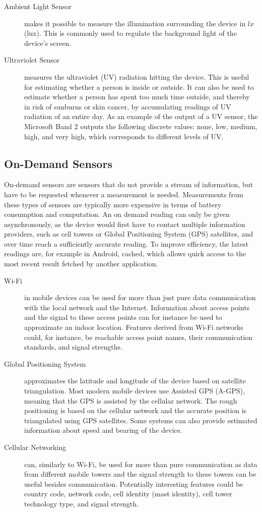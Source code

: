 \begin{description}
    \item[Ambient Light Sensor] makes it possible to measure the illumination surrounding the device in $lx$ (lux). This is commonly used to regulate the background light of the device's screen.
    \item[Ultraviolet Sensor] measures the ultraviolet (UV) radiation hitting the device. This is useful for estimating whether a person is inside or outside. It can also be used to estimate whether a person has spent too much time outside, and thereby in risk of sunburns or skin cancer, by accumulating readings of UV radiation of an entire day. As an example of the output of a UV sensor, the Microsoft Band 2 outputs the following discrete values: none, low, medium, high, and very high, which corresponds to different levels of UV. 
\end{description}

\subsection{On-Demand Sensors}
On-demand sensors are sensors that do not provide a stream of information, but have to be requested whenever a measurement is needed. Measurements from these types of sensors are typically more expensive in terms of battery consumption and computation. An on demand reading can only be given asynchronously, as the device would first have to contact multiple information providers, such as cell towers or Global Positioning System (GPS) satellites, and over time reach a sufficiently accurate reading. To improve efficiency, the latest readings are, for example in Android, cached, which allows quick access to the most recent result fetched by another application.

\begin{description}
    \item[Wi-Fi] in mobile devices can be used for more than just pure data communication with the local network and the Internet. Information about access points and the signal to these access points can for instance be used to approximate an indoor location. Features derived from Wi-Fi networks could, for instance, be reachable access point names, their communication standards, and signal strengths. 
    \item[Global Positioning System] approximates the latitude and longitude of the device based on satellite triangulation. Most modern mobile devices use Assisted GPS (A-GPS), meaning that the GPS is assisted by the cellular network. The rough positioning is based on the cellular network and the accurate position is triangulated using GPS satellites. Some systems can also provide estimated information about speed and bearing of the device.
    \item[Cellular Networking] can, similarly to Wi-Fi, be used for more than pure communication as data from different mobile towers and the signal strength to these towers can be useful besides communication. Potentially interesting features could be country code, network code, cell identity (mast identity), cell tower technology type, and signal strength.
\end{description}

